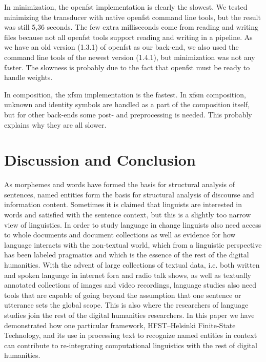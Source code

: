 \documentclass{llncs}
\begin{document}
In minimization, the openfst implementation is clearly the slowest. We tested minimizing
the transducer with native openfst command line tools, but the result was still 5,36 seconds.
The few extra milliseconds come from reading and writing files because not all openfst tools support reading
and writing in a pipeline. As we have an old version (1.3.1) of openfst as our back-end, we also
used the command line tools of the newest version (1.4.1), but minimization was not any faster.
The slowness is probably due to the fact that openfst must be ready to handle weights.

In composition, the xfsm implementation is the fastest. In xfsm composition, unknown and identity
symbols are handled as a part of the composition itself, but for other back-ends some post- and preprocessing is
needed. This probably explains why they are all slower.

\section{Discussion and Conclusion}\label{sec:discussion}

As morphemes and words have formed the basis for structural analysis
of sentences, named entities form the basis for structural analysis of
discourse and information content. Sometimes it is claimed that
linguists are interested in words and satisfied with the sentence
context, but this is a slightly too narrow view of linguistics. In
order to study language in change linguists also need access to whole
documents and document collections as well as evidence for how
language interacts with the non-textual world, which from a linguistic
perspective has been labeled pragmatics and which is the essence of
the rest of the digital humanities. With the advent of large
collections of textual data, i.e. both written and spoken language in
internet fora and radio talk shows, as well as textually annotated
collections of images and video recordings, language studies also need
tools that are capable of going beyond the assumption that one
sentence or utterance sets the global scope. This is also where the
researchers of language studies join the rest of the digital
humanities researchers. In this paper we have demonstrated how one
particular framework, HFST--Helsinki Finite-State Technology, and its
use in processing text to recognize named entities in context can
contribute to re-integrating computational linguistics with the rest
of digital humanities.




\end{document}
